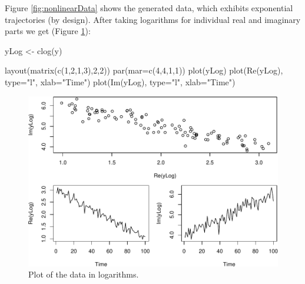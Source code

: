 \documentclass[
]{book}
\newenvironment{Shaded}{\begin{snugshade}}{\end{snugshade}}
\newcommand{\AttributeTok}[1]{\textcolor[rgb]{0.77,0.63,0.00}{#1}}
\newcommand{\DecValTok}[1]{\textcolor[rgb]{0.00,0.00,0.81}{#1}}
\newcommand{\FunctionTok}[1]{\textcolor[rgb]{0.00,0.00,0.00}{#1}}
\newcommand{\NormalTok}[1]{#1}
\newcommand{\OtherTok}[1]{\textcolor[rgb]{0.56,0.35,0.01}{#1}}
\newcommand{\StringTok}[1]{\textcolor[rgb]{0.31,0.60,0.02}{#1}}
\begin{document}
Figure \ref{fig:nonlinearData} shows the generated data, which exhibits exponential trajectories (by design). After taking logarithms for individual real and imaginary parts we get (Figure \ref{fig:nonlinearDataCLog}):

\begin{Shaded}
\begin{Highlighting}[]
\NormalTok{yLog }\OtherTok{\textless{}{-}} \FunctionTok{clog}\NormalTok{(y)}

\FunctionTok{layout}\NormalTok{(}\FunctionTok{matrix}\NormalTok{(}\FunctionTok{c}\NormalTok{(}\DecValTok{1}\NormalTok{,}\DecValTok{2}\NormalTok{,}\DecValTok{1}\NormalTok{,}\DecValTok{3}\NormalTok{),}\DecValTok{2}\NormalTok{,}\DecValTok{2}\NormalTok{))}
\FunctionTok{par}\NormalTok{(}\AttributeTok{mar=}\FunctionTok{c}\NormalTok{(}\DecValTok{4}\NormalTok{,}\DecValTok{4}\NormalTok{,}\DecValTok{1}\NormalTok{,}\DecValTok{1}\NormalTok{))}
\FunctionTok{plot}\NormalTok{(yLog)}
\FunctionTok{plot}\NormalTok{(}\FunctionTok{Re}\NormalTok{(yLog), }\AttributeTok{type=}\StringTok{"l"}\NormalTok{, }\AttributeTok{xlab=}\StringTok{"Time"}\NormalTok{)}
\FunctionTok{plot}\NormalTok{(}\FunctionTok{Im}\NormalTok{(yLog), }\AttributeTok{type=}\StringTok{"l"}\NormalTok{, }\AttributeTok{xlab=}\StringTok{"Time"}\NormalTok{)}
\end{Highlighting}
\end{Shaded}

\begin{figure}
\centering
\includegraphics{Svetunkov---Svetunkov---Complex-Valued-Econometrics_files/figure-latex/nonlinearDataCLog-1.pdf}
\caption{\label{fig:nonlinearDataCLog}Plot of the data in logarithms.}
\end{figure}
\end{document}
